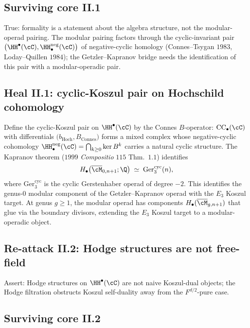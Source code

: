 \subsection*{Surviving core II.1}

True: formality is a statement about the algebra structure, not the
modular-operad pairing. The modular pairing factors through the
cyclic-invariant pair $\bigl(\HH^\bullet(\cC), \HH_\bullet^{\mathrm{neg}}(\cC)\bigr)$
of negative-cyclic homology (Connes--Tsygan $1983$, Loday--Quillen
$1984$); the Getzler--Kapranov bridge needs the identification of this
pair with a modular-operadic pair.

\subsection*{Heal II.1: cyclic-Koszul pair on Hochschild cohomology}

Define the cyclic-Koszul pair on $\HH^\bullet(\cC)$ by the Connes
$B$-operator: $\mathrm{CC}_\bullet(\cC)$ with differentials
$\bigl(b_{\mathrm{Hoch}}, B_{\mathrm{Connes}}\bigr)$ forms a mixed
complex whose negative-cyclic cohomology
$\HH^{\mathrm{neg}}_\bullet(\cC) = \bigcap_{k \geq 0} \ker B^k$ carries a
natural cyclic structure. The Kapranov theorem ($1999$ \emph{Compositio}
$115$ Thm.~$1.1$) identifies
\begin{equation}
\label{eq:kapranov-cyclic-moduli}
 H_\bullet\bigl(\overline{\cM}_{0, n + 1}; \Q\bigr) \;\simeq\;
 \mathrm{Ger}_3^{\mathrm{cyc}}(n),
\end{equation}
where $\mathrm{Ger}_3^{\mathrm{cyc}}$ is the cyclic Gerstenhaber operad
of degree $-2$. This identifies the genus-$0$ modular component of the
Getzler--Kapranov operad with the $E_3$ Koszul target. At genus $g \geq 1$,
the modular operad has components $H_\bullet(\overline{\cM}_{g, n + 1})$
that glue via the boundary divisors, extending the $E_3$ Koszul target
to a modular-operadic object.

\subsection*{Re-attack II.2: Hodge structures are not free-field}

Assert: Hodge structures on $\HH^\bullet(\cC)$ are not naive
Koszul-dual objects; the Hodge filtration obstructs Koszul self-duality
away from the $F^{d/2}$-pure case.

\subsection*{Surviving core II.2}

